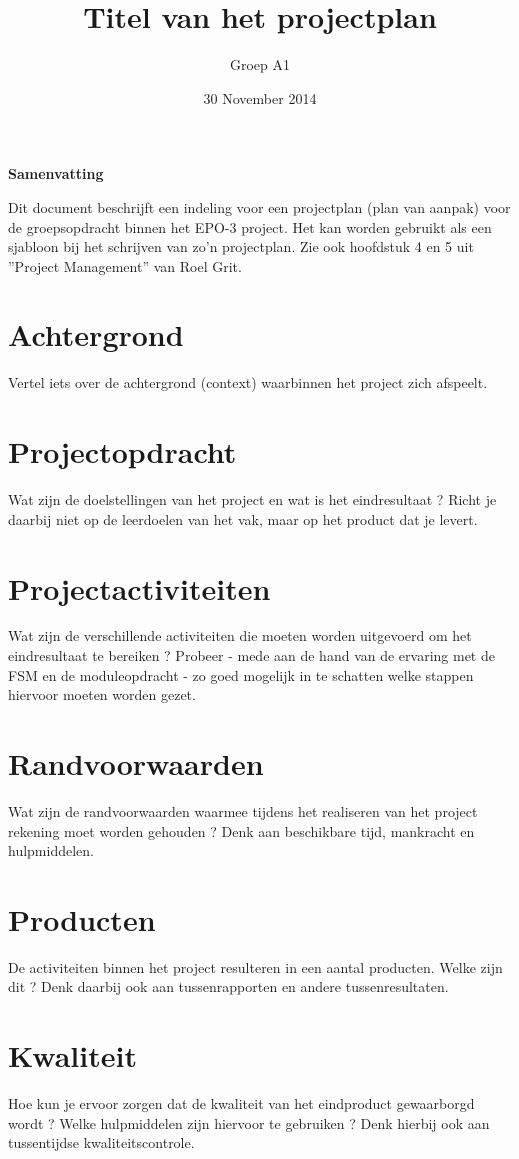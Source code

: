 \documentclass[11pt,twoside,a4paper]{article}
\title{Titel van het projectplan}
\author{Groep A1}
\date{30 November 2014}
\begin{document}
\maketitle
\thispagestyle{empty}
\vspace{30 mm}
\begin{center}
\Large \bf 
Samenvatting
\end{center}
Dit document beschrijft een indeling voor een projectplan (plan van aanpak) voor de groepsopdracht binnen het EPO-3 project. Het kan worden gebruikt als een sjabloon bij het schrijven van zo'n projectplan.  Zie ook hoofdstuk 4 en 5 uit ''Project Management'' van Roel Grit.
\clearpage

\tableofcontents
\clearpage

\section{Achtergrond}
Vertel iets over de achtergrond (context) waarbinnen het project zich afspeelt.
\section{Projectopdracht}
Wat zijn de doelstellingen van het project en wat is het eindresultaat ?  Richt je daarbij niet op de leerdoelen van het vak, maar op het product dat je levert. 
\section{Projectactiviteiten}
Wat zijn de verschillende activiteiten die moeten worden uitgevoerd om het eindresultaat te bereiken ?   Probeer - mede aan de hand van de ervaring met de FSM en de moduleopdracht - zo goed mogelijk in te schatten welke stappen hiervoor moeten worden gezet.
\section{Randvoorwaarden}
Wat zijn de randvoorwaarden waarmee tijdens het realiseren van het project rekening moet worden gehouden ?  Denk aan beschikbare tijd, mankracht en hulpmiddelen.
\section{Producten}
De activiteiten binnen het project resulteren in een aantal producten. Welke zijn dit ? Denk daarbij ook aan tussenrapporten en andere tussenresultaten.
\section{Kwaliteit}
Hoe kun je ervoor zorgen dat de kwaliteit van het eindproduct gewaarborgd wordt ? Welke hulpmiddelen zijn hiervoor te gebruiken ?  Denk hierbij ook aan tussentijdse kwaliteitscontrole.
\end{document}
